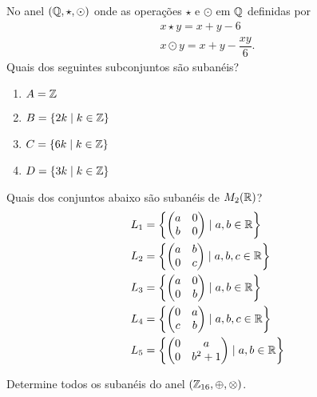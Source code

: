 \documentclass[12pt]{exam}
\begin{document}
\vspace{.3cm}

\questao{} No anel $(\mathbb{Q}, \star, \odot)$ onde as opera\c{c}\~oes $\star$ e $\odot$ em $\mathbb{Q}$ definidas por
\begin{align*}
	x \star y = x + y - 6\\
	x \odot y = x + y - \dfrac{xy}{6}.
\end{align*}
Quais dos seguintes subconjuntos s\~ao suban\'eis?
\begin{enumerate}[label=({\alph*})]
	\item $A = \mathbb{Z}$
	\item $B = \{2k \mid k \in \mathbb{Z}\}$
	\item $C = \{6k \mid k \in \mathbb{Z}\}$
	\item $D = \{3k \mid k \in \mathbb{Z}\}$
\end{enumerate}


\vspace{.3cm}

\questao{} Quais dos conjuntos abaixo s\~ao suban\'eis de $M_2(\mathbb{R})$?
\begin{align*}
	L_1 &= \left\{\begin{pmatrix}
		a & 0\\
		b & 0
	\end{pmatrix} \mid a, b \in \mathbb{R}\right\}\\
	L_2 &= \left\{\begin{pmatrix}
		a & b\\
		0 & c
	\end{pmatrix} \mid a, b, c \in \mathbb{R}\right\}\\
	L_3 &= \left\{\begin{pmatrix}
		a & 0\\
		0 & b
	\end{pmatrix} \mid a, b \in \mathbb{R}\right\}\\
	L_4 &= \left\{\begin{pmatrix}
		0 & a\\
		c & b
	\end{pmatrix} \mid a, b, c \in \mathbb{R}\right\}\\
	L_5 &= \left\{\begin{pmatrix}
		0 & a\\
		0 & b^2 + 1
	\end{pmatrix} \mid a, b \in \mathbb{R}\right\}
\end{align*}


\vspace{.3cm}

\questao{} Determine todos os suban\'eis do anel $(\mathbb{Z}_{16}, \oplus, \otimes)$.
\end{document}
